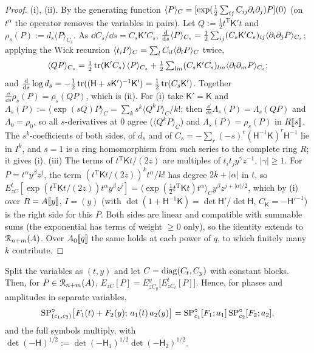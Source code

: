 \begin{proof}
(i), (ii). By the generating function $\langle P\rangle_C=[\exp(\frac12\sum_{ij}C_{ij}\partial_i\partial_j)P](0)$ (on $t^\alpha$ the operator removes the variables in pairs). Let $Q:=\frac12t^{\mathrm T}\mathsf K't$ and $\rho_s(P):=d_s\langle P\rangle_{C_s}$. As $\dd C_s/\dd s=C_s\mathsf K'C_s$, $\frac{\mathrm{d}}{\mathrm{d} s}\langle P\rangle_{C_s}=\frac12\sum_{ij}(C_s\mathsf K'C_s)_{ij}\langle\partial_i\partial_jP\rangle_{C_s}$; applying the Wick recursion $\langle t_iP\rangle_C=\sum_lC_{il}\langle\partial_lP\rangle_C$ twice,
\[
\langle QP\rangle_{C_s}=\tfrac12\operatorname{tr}(\mathsf K'C_s)\,\langle P\rangle_{C_s}+\tfrac12\textstyle\sum_{lm}(C_s\mathsf K'C_s)_{lm}\langle\partial_l\partial_mP\rangle_{C_s};
\]
and $\frac{\mathrm{d}}{\mathrm{d} s}\log d_s=-\frac12\operatorname{tr}((\mathsf H+s\mathsf K')^{-1}\mathsf K')=\frac12\operatorname{tr}(C_s\mathsf K')$. Together $\frac{\dd}{\dd s}\rho_s(P)=\rho_s(QP)$, which is (ii). For (i) take $\mathsf K'=\mathsf K$ and $\Lambda_s(P):=\langle\exp(sQ)P\rangle_C=\sum_ks^k\langle Q^kP\rangle_C/k!$; then $\frac{\dd}{\dd s}\Lambda_s(P)=\Lambda_s(QP)$ and $\Lambda_0=\rho_0$, so all $s$-derivatives at $0$ agree ($\langle Q^kP\rangle_C$) and $\Lambda_s(P)=\rho_s(P)$ in $R[\![ s ]\!]$. The $s^k$-coefficients of both sides, of $d_s$ and of $C_s=-\sum_r(-s)^r(\mathsf H^{-1}\mathsf K)^r\mathsf H^{-1}$ lie in $I^k$, and $s=1$ is a ring homomorphism from such series to the complete ring $R$; it gives (i).
(iii) The terms of $t^{\mathrm T}\mathsf Kt/(2z)$ are multiples of $t_it_jy^\gamma z^{-1}$, $|\gamma|\geq1$. For $P=t^\alpha y^\beta z^j$, the term $(t^{\mathrm T}\mathsf Kt/(2z))^kt^\alpha/k!$ has degree $2k+|\alpha|$ in $t$, so $E^t_{zC}[\exp(t^{\mathrm T}\mathsf Kt/(2z))t^\alpha y^\beta z^j]=\langle\exp(\frac12t^{\mathrm T}\mathsf Kt)t^\alpha\rangle_Cy^\beta z^{j+|\alpha|/2}$, which by (i) over $R=A[\![ y ]\!]$, $I=(y)$ (with $\det(1+\mathsf H^{-1}\mathsf K)=\det\mathsf H'/\det\mathsf H$, $C_{\mathsf K}=-\mathsf H'^{-1}$) is the right side for this $P$. Both sides are linear and compatible with summable sums (the exponential has terms of weight $\geq0$ only), so the identity extends to $\mathcal{R}_{n+m}(A)$. Over $A_0[\![ q ]\!]$ the same holds at each power of $q$, to which finitely many $k$ contribute.
\end{proof}

\begin{lem}[Products]
\label{lem:fsp-prod}
Split the variables as $(t,y)$ and let $C=\operatorname{diag}(C_t,C_y)$ with constant blocks. Then, for $P\in\mathcal{R}_{n+m}(A)$, $E_{zC}[P]=E^y_{zC_y}\bigl[E^t_{zC_t}[P]\bigr]$. Hence, for phases and amplitudes in separate variables,
\[
\mathrm{SP}^{\circ}_{(c_1,c_2)}\bigl[F_1(t)+F_2(y);\,a_1(t)\,a_2(y)\bigr]=\mathrm{SP}^{\circ}_{c_1}[F_1;a_1]\,\mathrm{SP}^{\circ}_{c_2}[F_2;a_2],
\]
and the full symbols multiply, with $\det(-\mathsf H)^{1/2}:=\det(-\mathsf H_1)^{1/2}\det(-\mathsf H_2)^{1/2}$.
\end{lem}

